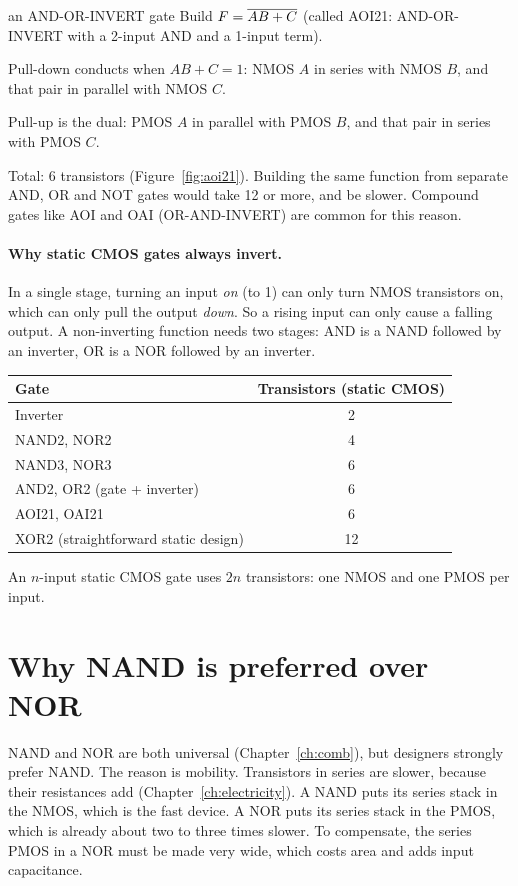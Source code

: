 \begin{worked}{an AND-OR-INVERT gate}
Build $F = \overline{AB + C}$ (called AOI21: AND-OR-INVERT with a 2-input AND and a 1-input term).

Pull-down conducts when $AB + C = 1$: NMOS $A$ in series with NMOS $B$, and that pair in parallel with NMOS $C$.

Pull-up is the dual: PMOS $A$ in parallel with PMOS $B$, and that pair in series with PMOS $C$.

Total: 6 transistors (Figure~\ref{fig:aoi21}). Building the same function from separate AND, OR and NOT gates would take 12 or more, and be slower. Compound gates like AOI and OAI (OR-AND-INVERT) are common for this reason.
\end{worked}

\paragraph{Why static CMOS gates always invert.} In a single stage, turning an input \emph{on} (to 1) can only turn NMOS transistors on, which can only pull the output \emph{down}. So a rising input can only cause a falling output. A non-inverting function needs two stages: AND is a NAND followed by an inverter, OR is a NOR followed by an inverter.

\begin{center}
\begin{tabular}{lc}
\toprule
Gate & Transistors (static CMOS) \\
\midrule
Inverter & 2 \\
NAND2, NOR2 & 4 \\
NAND3, NOR3 & 6 \\
AND2, OR2 (gate + inverter) & 6 \\
AOI21, OAI21 & 6 \\
XOR2 (straightforward static design) & 12 \\
\bottomrule
\end{tabular}
\end{center}
An $n$-input static CMOS gate uses $2n$ transistors: one NMOS and one PMOS per input.

\section{Why NAND is preferred over NOR}

NAND and NOR are both universal (Chapter~\ref{ch:comb}), but designers strongly prefer NAND. The reason is mobility. Transistors in series are slower, because their resistances add (Chapter~\ref{ch:electricity}). A NAND puts its series stack in the NMOS, which is the fast device. A NOR puts its series stack in the PMOS, which is already about two to three times slower. To compensate, the series PMOS in a NOR must be made very wide, which costs area and adds input capacitance.

